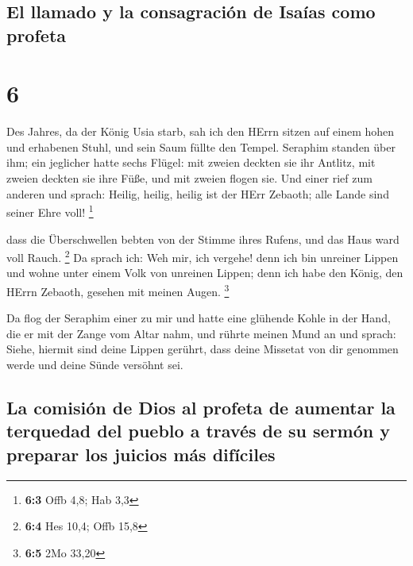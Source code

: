 \hypertarget{el-llamado-y-la-consagraciuxf3n-de-isauxedas-como-profeta}{%
\subsection{El llamado y la consagración de Isaías como
profeta}\label{el-llamado-y-la-consagraciuxf3n-de-isauxedas-como-profeta}}

\hypertarget{section-5}{%
\section{6}\label{section-5}}

 Des Jahres, da der König Usia starb, sah ich den HErrn
sitzen auf einem hohen und erhabenen Stuhl, und sein Saum füllte den
Tempel.  Seraphim standen über ihm; ein jeglicher hatte
sechs Flügel: mit zweien deckten sie ihr Antlitz, mit zweien deckten sie
ihre Füße, und mit zweien flogen sie.  Und einer rief zum
anderen und sprach: Heilig, heilig, heilig ist der HErr Zebaoth; alle
Lande sind seiner Ehre voll! \footnote{\textbf{6:3} Offb 4,8; Hab 3,3}

 dass die Überschwellen bebten von der Stimme ihres
Rufens, und das Haus ward voll Rauch. \footnote{\textbf{6:4} Hes 10,4;
  Offb 15,8}  Da sprach ich: Weh mir, ich vergehe! denn
ich bin unreiner Lippen und wohne unter einem Volk von unreinen Lippen;
denn ich habe den König, den HErrn Zebaoth, gesehen mit meinen Augen.
\footnote{\textbf{6:5} 2Mo 33,20}

 Da flog der Seraphim einer zu mir und hatte eine glühende
Kohle in der Hand, die er mit der Zange vom Altar nahm, 
und rührte meinen Mund an und sprach: Siehe, hiermit sind deine Lippen
gerührt, dass deine Missetat von dir genommen werde und deine Sünde
versöhnt sei.

\hypertarget{la-comisiuxf3n-de-dios-al-profeta-de-aumentar-la-terquedad-del-pueblo-a-travuxe9s-de-su-sermuxf3n-y-preparar-los-juicios-muxe1s-difuxedciles}{%
\subsection{La comisión de Dios al profeta de aumentar la terquedad del
pueblo a través de su sermón y preparar los juicios más
difíciles}\label{la-comisiuxf3n-de-dios-al-profeta-de-aumentar-la-terquedad-del-pueblo-a-travuxe9s-de-su-sermuxf3n-y-preparar-los-juicios-muxe1s-difuxedciles}}

